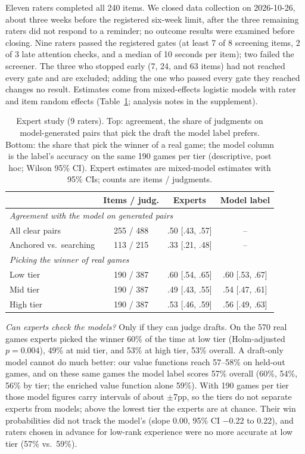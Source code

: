 \documentclass[journal]{IEEEtran}
\begin{document}
Eleven raters completed all 240 items. We closed data collection on 2026-10-26, about three weeks before the registered six-week limit, after the three remaining raters did not respond to a reminder; no outcome results were examined before closing. Nine raters passed the registered gates (at least 7 of 8 screening items, 2 of 3 late attention checks, and a median of 10 seconds per item); two failed the screener. The three who stopped early (7, 24, and 63 items) had not reached every gate and are excluded; adding the one who passed every gate they reached changes no result. Estimates come from mixed-effects logistic models with rater and item random effects (Table~\ref{tab:expert}; analysis notes in the supplement).

\begin{table}[t]
\centering
\caption{Expert study (9 raters). Top: agreement, the share of judgments on model-generated pairs that pick the draft the model label prefers. Bottom: the share that pick the winner of a real game; the model column is the label's accuracy on the same 190 games per tier (descriptive, post hoc; Wilson 95\% CI). Expert estimates are mixed-model estimates with 95\% CIs; counts are items / judgments.}
\label{tab:expert}
\setlength{\tabcolsep}{2.5pt}
\small
\begin{tabular}{lccc}
\toprule
 & Items / judg. & Experts & Model label \\
\midrule
\multicolumn{4}{l}{\textit{Agreement with the model on generated pairs}} \\
All clear pairs & 255 / 488 & .50 [.43, .57] & -- \\
Anchored vs.\ searching & 113 / 215 & .33 [.21, .48] & -- \\
\midrule
\multicolumn{4}{l}{\textit{Picking the winner of real games}} \\
Low tier & 190 / 387 & .60 [.54, .65] & .60 [.53, .67] \\
Mid tier & 190 / 387 & .49 [.43, .55] & .54 [.47, .61] \\
High tier & 190 / 387 & .53 [.46, .59] & .56 [.49, .63] \\
\bottomrule
\end{tabular}
\end{table}

\textit{Can experts check the models?} Only if they can judge drafts. On the 570 real games experts picked the winner 60\% of the time at low tier (Holm-adjusted $p = 0.004$), 49\% at mid tier, and 53\% at high tier, 53\% overall. A draft-only model cannot do much better: our value functions reach 57--58\% on held-out games, and on these same games the model label scores 57\% overall (60\%, 54\%, 56\% by tier; the enriched value function alone 59\%). With 190 games per tier those model figures carry intervals of about $\pm$7pp, so the tiers do not separate experts from models; above the lowest tier the experts are at chance. Their win probabilities did not track the model's (slope 0.00, 95\% CI $-$0.22 to 0.22), and raters chosen in advance for low-rank experience were no more accurate at low tier (57\% vs.\ 59\%).
\end{document}
